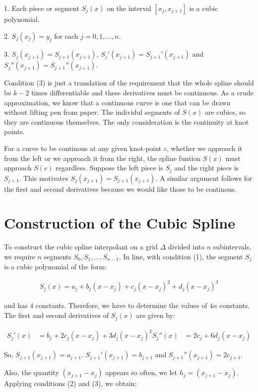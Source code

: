 \documentclass{article}
\theoremstyle{definition}
\begin{document}
1. Each piece or segment $S_j(x)$ on the interval $[x_j, x_{j+1}]$ is a cubic polynomial.

2. $S_j(x_j) = y_j$ for each $j = 0, 1, \ldots, n$.

3. $S_j(x_{j+1}) = S_{j+1}(x_{j + 1})$, $S_j'(x_{j+1}) = S_{j+1}'(x_{j+1})$ and $S_j''(x_{j+1}) = S_{j+1}''(x_{j+1})$.

Condition (3) is just a translation of the requirement that the whole spline should be $k-2$ times differentiable and these derivatives must be continuous. As a crude approximation, we know that a continuous curve is one that can be drawn without lifting pen from paper. The individul segments of $S(x)$ are cubics, so they are continuous themselves. The only consideration is the continuity at knot points.

For a curve to be continous at any given knot-point $c$, whether we approach it from the left or we approach it from the right, the spline funtion $S(x)$ must approach $S(c)$ regardless. Suppose the left piece is $S_j$ and the right piece is $S_{j+1}$. This motivates $S_j(x_{j + 1}) = S_{j + 1}(x_{j + 1})$. A similar argument follows for the first and second derivatives because we would like those to be continous.

\section{Construction of the Cubic Spline}

To construct the cubic spline interpolant on a grid $\Delta$ divided into $n$ subintervals, we require $n$ segments $S_0, S_1, \ldots, S_{n-1}$. In line, with condition (1), the segment $S_j$ is a cubic polynomial of the form:

\begin{align}
S_j(x) = a_j + b_j(x - x_j) + c_j(x - x_j)^2 + d_j(x - x_j)^3
\end{align}

and has $4$ constants. Therefore, we have to determine the values of $4n$ constants. The first and second derivatives of $S_j(x)$ are given by:

\begin{align}
    S_j'(x) &= b_j + 2c_j(x - x_j) + 3d_j(x - x_j)^2
    S_j''(x) &= 2c_j + 6d_j(x - x_j)
\end{align}
 
So, $S_{j+1}(x_{j+1}) = a_{j+1}$. $S_{j+1}'(x_{j+1}) = b_{j+1}$ and $S_{j+1}''(x_{j+1}) = 2c_{j+1}$.

Also, the quantity $(x_{j+1} - x_j)$ appears so often, we let $h_j = (x_{j+1} - x_j)$. Applying conditions (2) and (3), we obtain:
\end{document}
